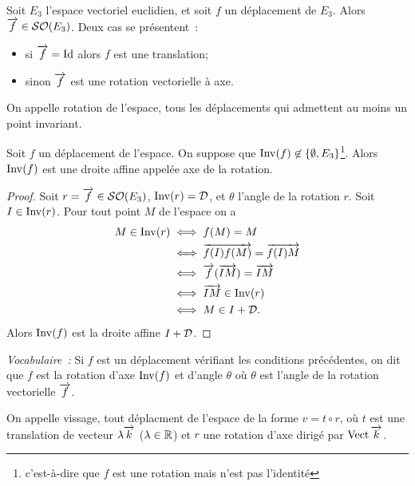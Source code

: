 Soit $E_3$ l'espace vectoriel euclidien, et soit $f$ un déplacement de $E_3$. Alors $\overrightarrow{f} \in \mathcal{SO}\!\left(E_3\right)$. Deux cas se présentent~:
\begin{itemize}
\item si $\overrightarrow{f}=\operatorname{Id}$ alors $f$ est une translation;
\item sinon $\overrightarrow{f}$ est une rotation vectorielle à axe.
\end{itemize}

\begin{defdef}
  On appelle rotation de l'espace, tous les déplacements qui admettent au moins un point invariant.
\end{defdef}
\begin{prop}
  Soit $f$ un déplacement de l'espace. On suppose que $\operatorname{Inv}(f) \not\in \{\emptyset, E_3\}$\footnote{c'est-à-dire que $f$ est une rotation mais n'est pas l'identité}. Alors $\operatorname{Inv}(f)$ est une droite affine appelée axe de la rotation.
\end{prop}
\begin{proof}
  Soit $r=\overrightarrow{f} \in\mathcal{SO}\!\left(E_3\right)$, $\operatorname{Inv}(r)=\mathcal{D}$, et $\theta$ l'angle de la rotation $r$. Soit $I \in \operatorname{Inv}(r)$. Pour tout point $M$ de l'espace on a
  \begin{align}
    M \in \operatorname{Inv}(r) &\iff f(M)=M \\
    &\iff \overrightarrow{f(I)f(M)} = \overrightarrow{f(I)M} \\
    &\iff \overrightarrow{f}(\overrightarrow{IM}) = \overrightarrow{IM} \\
    &\iff \overrightarrow{IM} \in \operatorname{Inv}(r)\\
    &\iff M \in I+\mathcal{D}.
  \end{align}
  Alors $\operatorname{Inv}(f)$ est la droite affine $I+\mathcal{D}$.
\end{proof}

\emph{Vocabulaire~:} Si $f$ est un déplacement vérifiant les conditions précédentes, on dit que $f$ est la rotation d'axe $\operatorname{Inv}(f)$ et d'angle $\theta$ où $\theta$ est l'angle de la rotation vectorielle $\overrightarrow{f}$.

\begin{defdef}
  On appelle vissage, tout déplacment de l'espace de la forme $v=t \circ r$, où $t$ est une translation de vecteur $\lambda \overrightarrow{k}$ ($\lambda \in \mathbb{R}$) et $r$ une rotation d'axe dirigé par $\operatorname{Vect}{\overrightarrow{k}}$.
\end{defdef}

